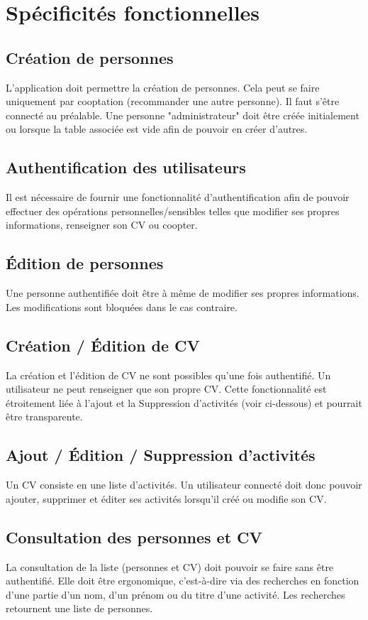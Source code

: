 \section{\textbf{Spécificités fonctionnelles}}
	
	\subsection{\textbf{Création de personnes}}
		L'application doit permettre la création de personnes. Cela peut se faire uniquement par cooptation (recommander une autre personne). Il faut s'être connecté au préalable. Une personne "administrateur" doit être créée initialement ou lorsque la table associée est vide afin de pouvoir en créer d'autres.

	\subsection{\textbf{Authentification des utilisateurs}}
		Il est nécessaire de fournir une fonctionnalité d'authentification afin de pouvoir effectuer des opérations personnelles/sensibles telles que modifier ses propres informations, renseigner son CV ou coopter.

	\subsection{\textbf{Édition de personnes}}
		Une personne authentifiée doit être à même de modifier ses propres informations. Les modifications sont bloquées dans le cas contraire. 

	\subsection{\textbf{Création / Édition de CV}}
		La création et l'édition de CV ne sont possibles qu'une fois authentifié. Un utilisateur ne peut renseigner que son propre CV. Cette fonctionnalité est étroitement liée à l'ajout et la Suppression d'activités (voir ci-dessous) et pourrait être transparente.

	\subsection{\textbf{Ajout / Édition / Suppression d'activités}}
		Un CV consiste en une liste d'activités. Un utilisateur connecté doit donc pouvoir ajouter, supprimer et éditer ses activités lorsqu'il créé ou modifie son CV.

	\subsection{\textbf{Consultation des personnes et CV}}
		La consultation de la liste (personnes et CV) doit pouvoir se faire sans être authentifié. Elle doit être ergonomique, c'est-à-dire via des recherches en fonction d'une partie d'un nom, d'un prénom ou du titre d'une activité. Les recherches retournent une liste de personnes.